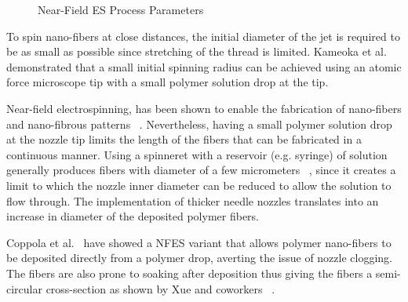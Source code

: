 \bgroup
\begin{figure}[!htbp]
\centering \makeatletter{}
\makeatother 
\caption{{Near-Field ES Process Parameters}}
\label{f-3629d3a3f9cf}
\end{figure}
\egroup
To spin nano-fibers at close distances, the initial diameter of the jet is required to be as small as possible since stretching of the thread is limited. Kameoka et al.\unskip~\cite{527120:12321556} demonstrated that a small initial spinning radius can be achieved using an atomic force microscope tip with a small polymer solution drop at the tip.

Near-field electrospinning, has been shown to enable the fabrication of nano-fibers and nano-fibrous patterns \unskip~\cite{527120:11974321}. Nevertheless, having a small polymer solution drop at the nozzle tip limits the length of the fibers that can be fabricated in a continuous manner. Using a spinneret with a reservoir (e.g. syringe) of solution generally produces fibers with diameter of a few micrometers \unskip~\cite{527120:11974310,527120:11974326}, since it creates a limit to which the nozzle inner diameter can be reduced to allow the solution to flow through. The implementation of thicker needle nozzles translates into an increase in diameter of the deposited polymer fibers.

Coppola et al.\unskip~\cite{527120:11974307} have showed a NFES variant that allows polymer nano-fibers to be deposited directly from a polymer drop, averting the issue of nozzle clogging. The fibers are also prone to soaking after deposition thus giving the fibers a semi-circular cross-section as shown by Xue and coworkers \unskip~\cite{527120:11974326}.



